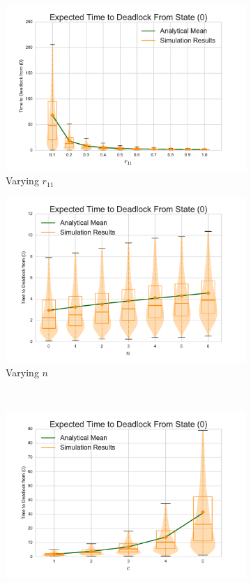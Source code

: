 \documentclass{article}
\numberwithin{equation}{section}
\begin{document}
\begin{figure}[!htbp]
\begin{center}
\begin{subfigure}[b]{0.35\textwidth}
    \includegraphics[width=\textwidth]{images/varyr11_1Nms}
    \caption{Varying $r_{11}$}
    \label{fig:1Nms_r11}
  \end{subfigure}
  \begin{subfigure}[b]{0.35\textwidth}
    \includegraphics[width=\textwidth]{images/varyn_1Nms}
    \caption{Varying $n$}
    \label{fig:1Nms_n}
  \end{subfigure}\\
  \begin{subfigure}[b]{0.35\textwidth}
    \includegraphics[width=\textwidth]{images/varyc_1Nms}

\end{subfigure}
\end{center}
\end{figure}
\end{document}
